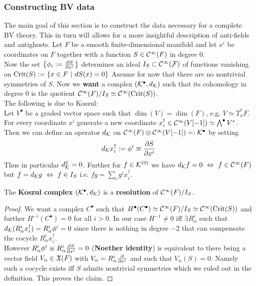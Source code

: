 \subsubsection{Constructing BV data}

The main goal of this section is to construct the data necessary for a complete BV theory. This in turn will allows for a more insightful description of anti-fields and antighosts. Let $F$ be a smooth finite-dimensional manifold and let ${x^i}$ be coordinates on $F$ together with a function $S \in \mathcal{C}^{\infty}(F)$ in degree $0$.\\

Now the set $\left\{\phi_i := \dell{S}{x^i}\right\}$ determines an ideal $I_S \subset \mathcal{C}^{\infty}({\mathcal{F}})$ of functions vanishing on $\operatorname{Crit}(S) := \{ x \in F \ | \ dS(x) = 0 \}$
Assume for now that there are no nontrivial symmetries of $S$. Now we \textbf{want} a complex $({\mathcal{K}}^\bullet, d_{{\mathcal{K}}})$ such that its cohomology in degree $0$ is the quotient $\mathcal{C}^{\infty}(F)/I_S \simeq \mathcal{C}^{\infty}(\operatorname{Crit}(S))$.\\

The following is due to Koszul:\\
Let $V^\bullet$ be a graded vector space such that $\dim(V) = \dim(F)$, e.g. $V \simeq T^*_x F$. For every coordinate $x^i$ generate a new coordinate $x^\dagger_i \in \mathcal{C}^{\infty}(V[-1]) \simeq \bigwedge^\bullet V^*$. Then we can define an operator $d_{{\mathcal{K}}}$ on $\mathcal{C}^{\infty}(F) \otimes \mathcal{C}^{\infty}(V[-1]) =: {\mathcal{K}}^\bullet$ by setting
\begin{equation}
  d_\KK x^\dagger_i := \phi^i \equiv \dell{S}{x^i}
\end{equation}
Thus in particular $d_{{\mathcal{K}}}^2 = 0$. Further for $f \in {\mathcal{K}}^{(0)}$ we have $d_{{\mathcal{K}}} f = 0 \ \Leftrightarrow \ f \in \mathcal{C}^{\infty}(F)$ but $f = d_\KK g \ \Leftrightarrow \ f \in I_S$ i.e. $fg = \sum_i g^i x^\dagger_i$.

\begin{prop}
  The \textbf{Koszul complex} $({\mathcal{K}}^\bullet, d_{{\mathcal{K}}})$ is a \textbf{resolution} of $\mathcal{C}^{\infty}(F)/I_S$.
\begin{proof}
  We want a complex $C^\bullet$ such that $H^\bullet(C^\bullet) \simeq \mathcal{C}^{\infty}(F)/I_S \simeq \mathcal{C}^{\infty}(\operatorname{Crit}(S))$ and further $H^{-i} (C^\bullet) = 0$ for all $i > 0$. In our case $H^{-1} \neq 0$ iff $\exists R^i_\alpha$ such that $d_\KK (R^i_\alpha x^\dagger_i) = R^i_\alpha \phi^i = 0$ since there is nothing in degree $-2$ that can compensate the cocycle $R^i_\alpha x^\dagger_i$.\\

  However $R^i_\alpha \phi^i \equiv R^i_\alpha \dell{S}{x^i} = 0$ (\textbf{Noether identity}) is equivalent to there being a vector field $V_\alpha \in \mathfrak{X}(F)$ with $V_\alpha = R^i_\alpha \frac{\partial }{\partial x^i}$ and such that $V_\alpha(S) = 0$. Namely such a cocycle exists iff $S$ admits nontrivial symmetries which we ruled out in the definition. This proves the claim.
\end{proof}
\end{prop}


